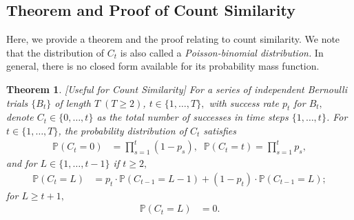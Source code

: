 \documentclass{article}
\theoremstyle{plain}
\newtheorem{theorem}{Theorem}[section]
\theoremstyle{definition}
\theoremstyle{remark}
\begin{document}
\subsection{Theorem and Proof of Count Similarity}
Here, we provide a theorem and the proof relating to count similarity. We note that the distribution of $C_t$ is also called a {\it Poisson-binomial distribution.} In general, there is no closed form available for its probability mass function.

\begin{theorem}
\label{thm:count_successes_distribution}
[Useful for Count Similarity] For a 
series of independent Bernoulli trials $\{B_t\}$ of length $T\;(T\geq 2)$, $t\in \{1, \dots, T\},$ with success rate $p_t$ for $B_t,$ denote $C_t \in \{0, \dots, t\}$ as the total number of successes in time steps $\{ 1, \dots, t\}$. 
For $t\in\{1, \dots, T\}$, the probability distribution of $C_t$ satisfies
\begin{align}
\mathbb{P}(C_t=0) &=\prod_{s=1}^t(1-p_s), \;\;
 \mathbb{P}(C_t=t) =\prod_{s=1}^t p_s,
 \end{align}
 and for $L\in\{1, \dots, t-1\}$ if $t\geq 2,$
 \begin{align}
 \mathbb{P}(C_t=L) &=p_t\cdot\mathbb{P}(C_{t-1}=L-1) + (1-p_t)\cdot \mathbb{P}(C_{t-1}=L);
    \end{align}
    for $ L\geq t+1,$
    \begin{align}
    \mathbb{P}(C_t=L)&=0.
\end{align}
\end{theorem}
\end{document}
